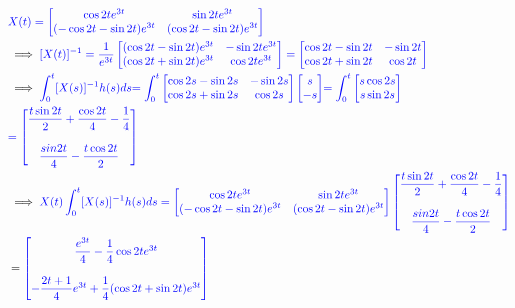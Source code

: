 \documentclass[a4paper]{article}
\begin{document}
\begin{align*}
\notag
&\textcolor{blue}{X(t)= \begin{bmatrix} \cos{2t}e^{3t} & \sin{2t}e^{3t}\\ (-\cos{2t}-\sin{2t})e^{3t} & (\cos{2t}-\sin{2t})e^{3t} \end{bmatrix}} \\
&\implies \textcolor{blue}{[X(t)]^{-1}= \dfrac{1}{e^{3t}} \begin{bmatrix} (\cos{2t}-\sin{2t})e^{3t} & -\sin{2t}e^{3t}\\ (\cos{2t}+\sin{2t)}e^{3t} &  \cos{2t}e^{3t} \end{bmatrix}= \begin{bmatrix} \cos{2t}-\sin{2t} & -\sin{2t}\\ \cos{2t}+\sin{2t} &  \cos{2t} \end{bmatrix}}\\
&\implies  \textcolor{blue}
{\int_{0}^{t}[X(s)]^{-1}h(s) ds }\textcolor{blue}{=\int_{0}^{t}\begin{bmatrix} \cos{2s}-\sin{2s} & -\sin{2s}\\ \cos{2s}+\sin{2s} &  \cos{2s} \end{bmatrix}\begin{bmatrix} s \\ -s\end{bmatrix}}
 \textcolor{blue}{= \int_{0}^{t}\begin{bmatrix} s\cos{2s} \\ s\sin{2s} \end{bmatrix}}\\
 &\textcolor{blue}{= \begin{bmatrix} \dfrac{t\sin{2t}}{2}+\dfrac{\cos{2t}}{4}-\dfrac{1}{4}\\\\ \dfrac{sin{2t}}{4}-\dfrac{t\cos{2t}}{2}\end{bmatrix}} 
 \\ &\implies \textcolor{blue}
{X(t)\int_{0}^{t}[X(s)]^{-1}h(s) ds = \begin{bmatrix} \cos{2t}e^{3t} & \sin{2t}e^{3t}\\ (-\cos{2t}-\sin{2t})e^{3t} & (\cos{2t}-\sin{2t})e^{3t} \end{bmatrix}\begin{bmatrix} \dfrac{t\sin{2t}}{2}+\dfrac{\cos{2t}}{4}-\dfrac{1}{4}\\\\ \dfrac{sin{2t}}{4}-\dfrac{t\cos{2t}}{2}\end{bmatrix}}\\ 
&=\textcolor{blue}{
\begin{bmatrix} \dfrac{e^{3t}}{4}-\dfrac{1}{4}\cos{2t}e^{3t}   \\\\ -\dfrac{2t+1}{4}e^{3t}+\dfrac{1}{4}(\cos{2t}+\sin{2t})e^{3t}\end{bmatrix}}
 \end{align*}
\end{document}
